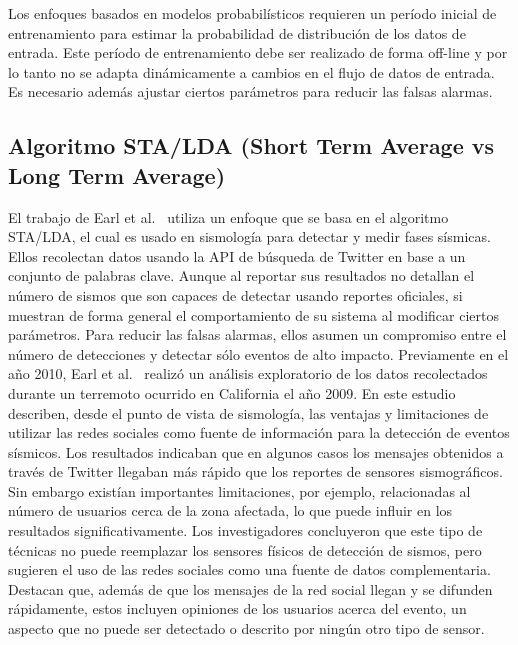 Los enfoques basados en modelos probabilísticos requieren un período inicial de entrenamiento para estimar la probabilidad de distribución de los datos de entrada.
%
Este período de entrenamiento debe ser realizado de forma off-line y por lo tanto no se adapta dinámicamente a cambios en el flujo de datos de entrada. 
%
Es necesario además ajustar ciertos parámetros para reducir las falsas alarmas. 


\subsection{Algoritmo STA/LDA (Short Term Average vs Long Term Average)}
\label{sec:stalda}
El trabajo de Earl et al.~\cite{earle2012twitter} utiliza un enfoque que se basa en el algoritmo STA/LDA, el cual es usado en sismología para detectar y medir fases sísmicas. 
%
Ellos recolectan datos usando la API de búsqueda de Twitter en base a un conjunto de palabras clave.
%
Aunque al reportar sus resultados no detallan el número de sismos que son capaces de detectar usando reportes oficiales, si muestran de forma general el comportamiento de su sistema al modificar ciertos parámetros. 
%
Para reducir las falsas alarmas, ellos asumen un compromiso entre el número de detecciones y detectar sólo eventos de alto impacto.
%
Previamente en el año 2010, Earl et al.~\cite{earle2010omg} realizó un análisis exploratorio de los datos recolectados durante un terremoto ocurrido en California el año 2009. 
%
En este estudio describen, desde el punto de vista de sismología, las ventajas y limitaciones de utilizar las redes sociales como fuente de información para la detección de eventos sísmicos.
% 
Los resultados indicaban que en algunos casos los mensajes obtenidos a través de Twitter llegaban más rápido que los reportes de sensores sismográficos. 
%
Sin embargo existían importantes limitaciones, por ejemplo, relacionadas al número de usuarios cerca de la zona afectada, lo que puede influir en los resultados significativamente.
%
Los investigadores concluyeron que este tipo de técnicas no puede reemplazar los sensores físicos de detección de sismos, pero sugieren el uso de las redes sociales como una fuente de datos complementaria. 
%
Destacan que, además de que los mensajes de la red social llegan y se difunden rápidamente, estos incluyen opiniones de los usuarios acerca del evento, un aspecto que no puede ser detectado o descrito por ningún otro tipo de sensor. 


